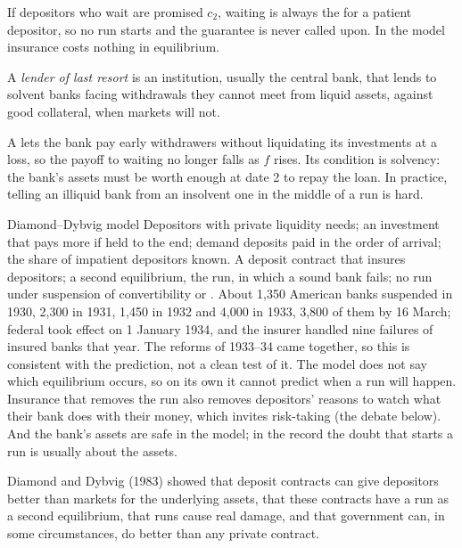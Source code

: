 If depositors who wait are promised $c_2$, waiting is always the  for a patient depositor, so no run starts
and the guarantee is never called upon. In the model insurance costs nothing in equilibrium.

\begin{definition}\label{def:b2:banks-and-crises:llr}
A \emph{lender of last resort} is an institution, usually the central bank, that lends to
solvent banks facing withdrawals they cannot meet from liquid assets, against good collateral, when markets will not.
\end{definition}

A  lets the bank pay early withdrawers without liquidating its investments at a loss, so the payoff
to waiting no longer falls as $f$ rises. Its condition is solvency: the bank's assets must be worth enough at date 2 to
repay the loan. In practice, telling an illiquid bank from an insolvent one in the middle of a run is hard.

\begin{model}{Diamond--Dybvig model}
\assumes Depositors with private liquidity needs; an investment that pays more if held to the end; demand deposits paid in
the order of arrival; the share of impatient depositors known.
\predicts A deposit contract that insures depositors; a second equilibrium, the run, in which a sound bank fails; no run
under suspension of convertibility or .
\tested About 1,350 American banks suspended in 1930, 2,300 in 1931, 1,450 in 1932 and 4,000 in 1933, 3,800 of them by 16
March; federal  took effect on 1 January 1934, and the insurer handled nine failures of insured banks
that year. The reforms of 1933--34 came together, so this is consistent with the prediction, not a clean test of it.
\breaks The model does not say which equilibrium occurs, so on its own it cannot predict when a run will happen. Insurance
that removes the run also removes depositors' reasons to watch what their bank does with their money, which invites
risk-taking (the debate below). And the bank's assets are safe in the model; in the record the doubt that starts a run is
usually about the assets.
\end{model}

Diamond and Dybvig (1983) showed that deposit contracts can give depositors better  than markets for the
underlying assets, that these contracts have a run as a second equilibrium, that runs cause real damage, and that
government  can, in some circumstances, do better than any private contract.

